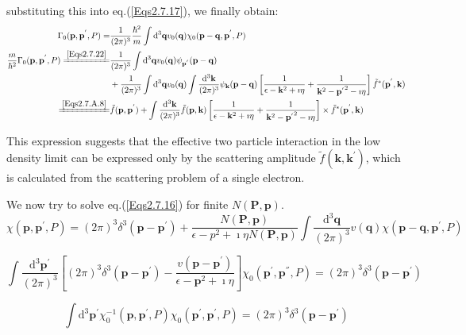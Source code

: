 substituting this into eq.(\ref{Eqs2.7.17}), we finally obtain:
\begin{equation} \label{Eqs2.7.23} \begin{split}
\Gamma_0(\mathbf{p},\mathbf{p}^{'},P) =& \frac{1}{(2\pi)^3} \frac{\hbar^2}{m} \int \mathrm{d}^3\mathbf{q} v_0(\mathbf{q}) \chi_0(\mathbf{p}-\mathbf{q},\mathbf{p}^{'},P)\\
\frac{m}{\hbar^2}\Gamma_0(\mathbf{p},\mathbf{p}^{'},P) \xlongequal{\ref{Eqs2.7.22}}&\frac{1}{(2\pi)^3} \int \mathrm{d}^3 \mathbf{q} v_0(\mathbf{q}) \psi_{\mathbf{p}^{'}}(\mathbf{p}-\mathbf{q})\\
&+ \frac{1}{(2\pi)^3} \int \mathrm{d}^3 \mathbf{q} v_0(\mathbf{q}) \int \frac{\mathrm{d}^3\mathbf{k}}{(2\pi)^3} \psi_{\mathbf{k}}(\mathbf{p}-\mathbf{q})\left[ \frac{1}{\epsilon-\mathbf{k}^2+\imath \eta} + \frac{1}{\mathbf{k}^2-{\mathbf{p}^{'}}^2-\imath \eta} \right] \tilde{f}^{*}(\mathbf{p}^{'},\mathbf{k})\\
\xlongequal{\ref{Eqs2.7.A.8}}& \tilde{f}(\mathbf{p},\mathbf{p}^{'}) + \int \frac{\mathrm{d}^3 \mathbf{k}}{(2\pi)^3} \tilde{f}(\mathbf{p},\mathbf{k})\left[ \frac{1}{\epsilon-\mathbf{k}^2+\imath \eta} + \frac{1}{\mathbf{k}^2-{\mathbf{p}^{'}}^2-\imath \eta} \right] \times \tilde{f}^{*}(\mathbf{p}^{'},\mathbf{k})
\end{split}\end{equation}

This expression suggests that the effective two particle interaction in the low density limit can be expressed only by the scattering amplitude $\tilde{f}(\mathbf{k},\mathbf{k}^{'})$, which is calculated from the scattering problem of a single electron.

We now try to solve eq.(\ref{Eqs2.7.16}) for finite $N(\mathbf{P},\mathbf{p})$.
\begin{equation*} \label{Eqs2.7.16'} \tag{2.7.16'}
\chi(\mathbf{p},\mathbf{p}^{'},P)=(2\pi)^3 \delta^3(\mathbf{p}-\mathbf{p}^{'}) + \frac{N(\mathbf{P},\mathbf{p})}{\epsilon - p^2 + \imath \eta N(\mathbf{P},\mathbf{p})} \int \frac{\mathrm{d}^3\mathbf{q}}{(2\pi)^3}v(\mathbf{q})\chi(\mathbf{p}-\mathbf{q},\mathbf{p}^{'},P)
\end{equation*}

\[\int \frac{\mathrm{d}^3\mathbf{p}^{'}}{(2\pi)^3}\left[ (2\pi)^3 \delta^3(\mathbf{p}-\mathbf{p}^{'})-\frac{v(\mathbf{p}-\mathbf{p}^{'})}{\epsilon-\mathbf{p}^2+\imath \eta} \right] \chi_0(\mathbf{p}^{'},\mathbf{p}^{''},P) = (2\pi)^3 \delta^3(\mathbf{p}-\mathbf{p}^{'}) \]

\[ \int \mathrm{d}^3 \mathbf{p}^{'} \chi_0^{-1}(\mathbf{p},\mathbf{p}^{'},P)\chi_0(\mathbf{p}^{'},\mathbf{p}^{'},P) = (2\pi)^3 \delta^3(\mathbf{p}-\mathbf{p}^{'})\]

